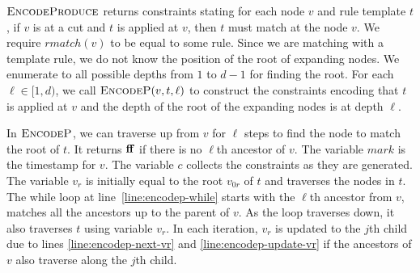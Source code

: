 $\textsc{EncodeProduce}$ returns constraints stating for each node $v$
and rule template $t$,
if $v$ is at a cut and $t$ is applied at $v$, then $t$ must match
at the node $v$.
We require $rmatch(v)$ to be equal to some rule.
Since we are matching with a template rule, we do not know the
position of the root of expanding nodes.
We enumerate to all possible depths from $1$ to $d-1$ for finding
the root.
For each $\ell \in [1,d)$, we call $\textsc{EncodeP}( v, t, \ell)$
to construct the constraints encoding that $t$ is applied at $v$
and the depth of the root of the expanding nodes is at depth $\ell$.


In $\textsc{EncodeP}$, we can traverse up from $v$ for $\ell$ steps to
find the node to match the root of $t$.
It returns $\mathbf{ff}$ if there
is no $\ell$th ancestor of $v$. %
The variable $mark$ is the timestamp for $v$.
The variable $c$ collects the  constraints as they are
generated. %
The variable $v_r$ is initially equal to the root $v_{0r}$ of $t$
and traverses the nodes in $t$.
The while loop at line~\ref{line:encodep-while} starts with
the $\ell$th ancestor from $v$,
matches all the ancestors up to the parent of $v$.
As the loop traverses down, it also traverses $t$ 
using variable $v_r$.
In each iteration, $v_r$ is updated to the $j$th child due to lines
\ref{line:encodep-next-vr} and \ref{line:encodep-update-vr}
if the ancestors of $v$ also traverse along the $j$th child.

\vspace{-10mm}

 
